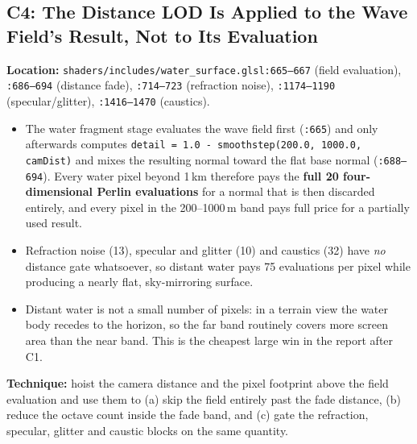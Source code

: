 \documentclass[11pt,a4paper]{article}
\begin{document}
\subsection{C4: The Distance LOD Is Applied to the Wave Field's Result, Not to Its Evaluation}

\textbf{Location:} \texttt{shaders/includes/water\_surface.glsl:665--667} (field evaluation),
\texttt{:686--694} (distance fade), \texttt{:714--723} (refraction noise), \texttt{:1174--1190} (specular/glitter),
\texttt{:1416--1470} (caustics).

\begin{itemize}
    \item The water fragment stage evaluates the wave field first (\texttt{:665}) and only afterwards computes
    \texttt{detail = 1.0 - smoothstep(200.0, 1000.0, camDist)} and mixes the resulting normal toward the flat base
    normal (\texttt{:688--694}). Every water pixel beyond 1\,km therefore pays the \textbf{full 20 four-dimensional
    Perlin evaluations} for a normal that is then discarded entirely, and every pixel in the 200--1000\,m band pays full
    price for a partially used result.
    \item Refraction noise (13), specular and glitter (10) and caustics (32) have \emph{no} distance gate whatsoever, so
    distant water pays 75 evaluations per pixel while producing a nearly flat, sky-mirroring surface.
    \item Distant water is not a small number of pixels: in a terrain view the water body recedes to the horizon, so the
    far band routinely covers more screen area than the near band. This is the cheapest large win in the report after C1.
\end{itemize}

\textbf{Technique:} hoist the camera distance and the pixel footprint above the field evaluation and use them to (a) skip
the field entirely past the fade distance, (b) reduce the octave count inside the fade band, and (c) gate the refraction,
specular, glitter and caustic blocks on the same quantity.
\end{document}
